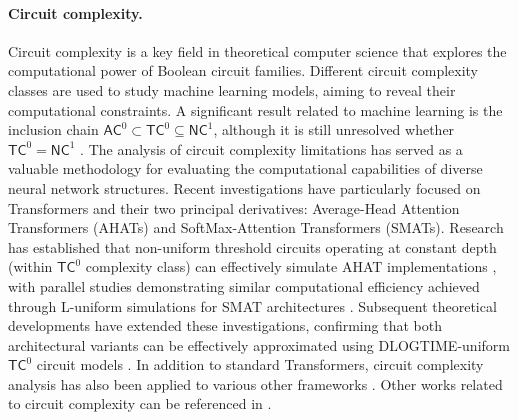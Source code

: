 \paragraph{Circuit complexity.} Circuit complexity is a key field in theoretical computer science that explores the computational power of Boolean circuit families. Different circuit complexity classes are used to study machine learning models, aiming to reveal their computational constraints. A significant result related to machine learning is the inclusion chain $\mathsf{AC}^0 \subset \mathsf{TC}^0 \subseteq \mathsf{NC}^1$, although it is still unresolved whether $\mathsf{TC}^0 = \mathsf{NC}^1$ \cite{v99,ab09}. 
The analysis of circuit complexity limitations has served as a valuable methodology for evaluating the computational capabilities of diverse neural network structures. Recent investigations have particularly focused on Transformers and their two principal derivatives: Average-Head Attention Transformers (AHATs) and SoftMax-Attention Transformers (SMATs). Research has established that non-uniform threshold circuits operating at constant depth (within $\mathsf{TC}^0$ complexity class) can effectively simulate AHAT implementations \cite{mss22}, with parallel studies demonstrating similar computational efficiency achieved through L-uniform simulations for SMAT architectures \cite{lag+22}. Subsequent theoretical developments have extended these investigations, confirming that both architectural variants can be effectively approximated using \textsf{DLOGTIME}-uniform $\mathsf{TC}^0$ circuit models \cite{ms24}.
In addition to standard Transformers, circuit complexity analysis has also been applied to various other frameworks \cite{cll+24_mamba_circut,kll+25_circuit_var}. Other works related to circuit complexity can be referenced in \cite{cll+24,cll+24_tensor_tc,lll+24_hopfield_tc,cll+25_mamba_tc,lls+25,lls+25_grok}.